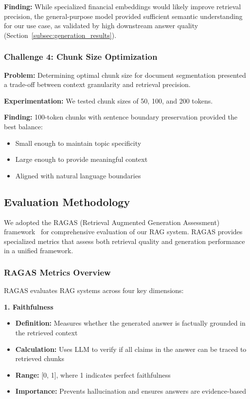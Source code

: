 \textbf{Finding:} While specialized financial embeddings would likely improve retrieval precision, the general-purpose model provided sufficient semantic understanding for our use case, as validated by high downstream answer quality (Section~\ref{subsec:generation_results}).

\subsubsection{Challenge 4: Chunk Size Optimization}

\textbf{Problem:} Determining optimal chunk size for document segmentation presented a trade-off between context granularity and retrieval precision.

\textbf{Experimentation:} We tested chunk sizes of 50, 100, and 200 tokens.

\textbf{Finding:} 100-token chunks with sentence boundary preservation provided the best balance:
\begin{itemize}
    \item Small enough to maintain topic specificity
    \item Large enough to provide meaningful context
    \item Aligned with natural language boundaries
\end{itemize}

\subsection{Evaluation Methodology}
\label{subsec:evaluation_methodology}

We adopted the RAGAS (Retrieval Augmented Generation Assessment) framework~\cite{ragas} for comprehensive evaluation of our RAG system. RAGAS provides specialized metrics that assess both retrieval quality and generation performance in a unified framework.

\subsubsection{RAGAS Metrics Overview}

RAGAS evaluates RAG systems across four key dimensions:

\textbf{1. Faithfulness}
\begin{itemize}
    \item \textbf{Definition:} Measures whether the generated answer is factually grounded in the retrieved context
    \item \textbf{Calculation:} Uses LLM to verify if all claims in the answer can be traced to retrieved chunks
    \item \textbf{Range:} [0, 1], where 1 indicates perfect faithfulness
    \item \textbf{Importance:} Prevents hallucination and ensures answers are evidence-based
\end{itemize}

